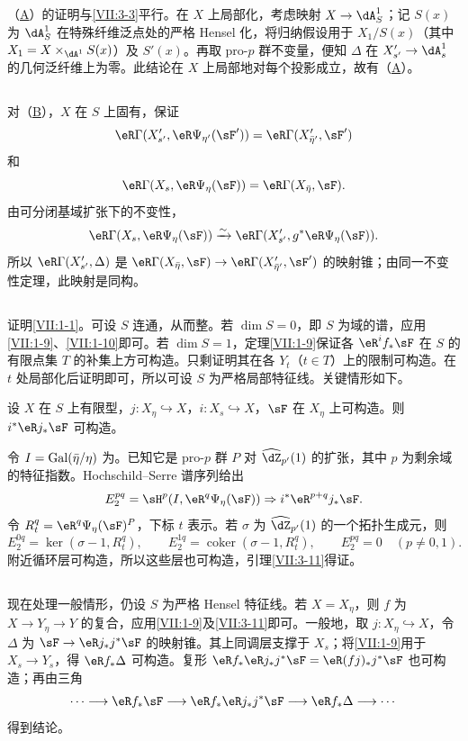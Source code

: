 \subsection{}\label{VII:3-8}
（\hyperlink{VII:3-A}{A}）的证明与\ref{VII:3-3}平行。在 $X$ 上局部化，考虑映射 $X\to\dA_S^1$；记 $S(x)$ 为 $\dA_S^1$ 在特殊纤维泛点处的严格 Hensel 化，将归纳假设用于 $X_1/S(x)$（其中 $X_1=X\times_{\dA^1}S(x)$）及 $S'(x)$。再取 pro-$p$ 群不变量，便知 $\Delta$ 在 $X'_{s'}\to\dA_s^1$ 的几何泛纤维上为零。此结论在 $X$ 上局部地对每个投影成立，故有（\hyperlink{VII:3-A}{A}）。
\subsection{}\label{VII:3-9}
对（\hyperlink{VII:3-B}{B}），$X$ 在 $S$ 上固有，保证
\[
 \eR\Gamma(X'_{s'},\eR\Psi_{\eta'}(\sF'))=\eR\Gamma(X'_{\bar\eta'},\sF')
\]
和
\[
 \eR\Gamma(X_s,\eR\Psi_\eta(\sF))=\eR\Gamma(X_{\bar\eta},\sF).
\]
由可分闭基域扩张下的不变性，
\[
 \eR\Gamma(X_s,\eR\Psi_\eta(\sF))\iso\eR\Gamma(X'_{s'},g^\ast\eR\Psi_\eta(\sF)).
\]
所以 $\eR\Gamma(X'_{s'},\Delta)$ 是
$\eR\Gamma(X_{\bar\eta},\sF)\to\eR\Gamma(X'_{\bar\eta'},\sF')$ 的映射锥；由同一不变性定理，此映射是同构。
\subsection{}\label{VII:3-10}
证明\ref{VII:1-1}。可设 $S$ 连通，从而整。若 $\dim S=0$，即 $S$ 为域的谱，应用\ref{VII:1-9}、\ref{VII:1-10}即可。若 $\dim S=1$，定理\ref{VII:1-9}保证各 $\eR^i f_\ast\sF$ 在 $S$ 的有限点集 $T$ 的补集上方可构造。只剩证明其在各 $Y_t$（$t\in T$）上的限制可构造。在 $t$ 处局部化后证明即可，所以可设 $S$ 为严格局部特征线。关键情形如下。
\begin{lemma_}\label{VII:3-11}
设 $X$ 在 $S$ 上有限型，$j:X_\eta\hookrightarrow X$，$i:X_s\hookrightarrow X$，$\sF$ 在 $X_\eta$ 上可构造。则 $i^\ast\eR j_\ast\sF$ 可构造。
\end{lemma_}
令 $I=\operatorname{Gal}(\bar\eta/\eta)$ 为。已知它是 pro-$p$ 群 $P$ 对 $\widehat\dZ_{p'}(1)$ 的扩张，其中 $p$ 为剩余域的特征指数。Hochschild--Serre 谱序列给出
\[
 E_2^{pq}=\sH^p(I,\eR^q\Psi_\eta(\sF))\Rightarrow i^\ast\eR^{p+q}j_\ast\sF.
\]
令 $R_t^q=\eR^q\Psi_\eta(\sF)^P$，下标 $t$ 表示。若 $\sigma$ 为 $\widehat\dZ_{p'}(1)$ 的一个拓扑生成元，则
\[
 E_2^{0q}=\ker(\sigma-1,R_t^q),\qquad
 E_2^{1q}=\operatorname{coker}(\sigma-1,R_t^q),\qquad
 E_2^{pq}=0\quad(p\ne0,1).
\]
附近循环层可构造，所以这些层也可构造，引理\ref{VII:3-11}得证。
\subsection{}\label{VII:3-12}
现在处理一般情形，仍设 $S$ 为严格 Hensel 特征线。若 $X=X_\eta$，则 $f$ 为 $X\to Y_\eta\to Y$ 的复合，应用\ref{VII:1-9}及\ref{VII:3-11}即可。一般地，取 $j:X_\eta\hookrightarrow X$，令 $\Delta$ 为 $\sF\to\eR j_\ast j^\ast\sF$ 的映射锥。其上同调层支撑于 $X_s$；将\ref{VII:1-9}用于 $X_s\to Y_s$，得 $\eR f_\ast\Delta$ 可构造。复形 $\eR f_\ast\eR j_\ast j^\ast\sF=\eR(fj)_\ast j^\ast\sF$ 也可构造；再由三角
\[
 \cdots\longrightarrow\eR f_\ast\sF\longrightarrow\eR f_\ast\eR j_\ast j^\ast\sF\longrightarrow\eR f_\ast\Delta\longrightarrow\cdots
\]
得到结论。


